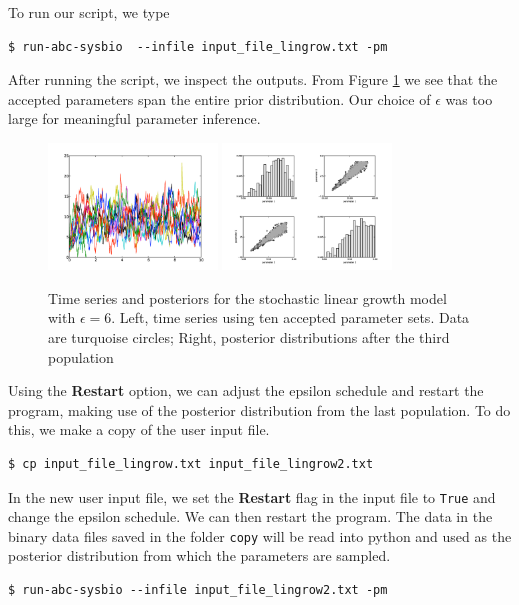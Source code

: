 \documentclass[a4paper]{report}
\begin{document}
To run our script, we type
\begin{verbatim}
$ run-abc-sysbio  --infile input_file_lingrow.txt -pm
\end{verbatim}
After running the script, we inspect the outputs.  From Figure \ref{LinGrow1} we see that the accepted parameters span the entire prior distribution. Our choice of $\epsilon$ was too large for meaningful parameter inference. 
\begin{figure}[htbp]
\centering
\includegraphics[width=0.4\textwidth]{Graphics/TimeSeriesLinGrow1.png}
\includegraphics[width=0.4\textwidth]{Graphics/ScatterPlotsLinGrow1.png}
\caption{Time series and posteriors for the stochastic linear growth model with $\epsilon = 6$. Left, time series using ten accepted parameter sets. Data are turquoise circles; Right, posterior distributions after the third population \label{LinGrow1}}
\end{figure}
Using the \textbf{Restart} option, we can adjust the epsilon schedule and restart the program, making use of the posterior distribution from the last population. To do this, we make a copy of the user input file.
\begin{verbatim}
$ cp input_file_lingrow.txt input_file_lingrow2.txt
\end{verbatim}
In the new user input file, we set the \textbf{Restart} flag in the input file to \verb$True$ and change the epsilon schedule. We can then restart the program. The data in the binary data files saved in the folder \verb$copy$ will be read into python and used as the posterior distribution from which the parameters are sampled.
\begin{verbatim}
$ run-abc-sysbio --infile input_file_lingrow2.txt -pm
\end{verbatim}
\end{document}

